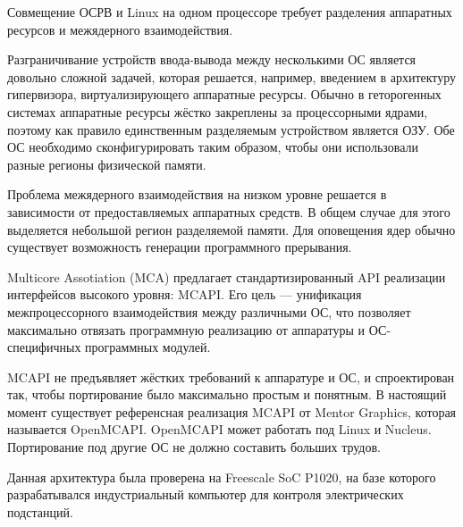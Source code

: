 \documentclass[10pt, a5paper]{article}
\begin{document}
Совмещение ОСРВ и Linux на одном процессоре требует разделения аппаратных ресурсов и межядерного взаимодействия.

Разграничивание устройств ввода-вывода между несколькими ОС является довольно сложной задачей, которая решается, например, введением в архитектуру гипервизора, виртуализирующего аппаратные ресурсы. Обычно в геторогенных системах аппаратные ресурсы жёстко закреплены за процессорными ядрами, поэтому как правило единственным разделяемым устройством является ОЗУ. Обе ОС необходимо сконфигурировать таким образом, чтобы они использовали разные регионы физической памяти.

Проблема межядерного взаимодействия на низком уровне решается в зависимости от предоставляемых аппаратных средств. В общем случае для этого выделяется небольшой регион разделяемой памяти. Для оповещения ядер обычно существует возможность генерации программного прерывания.

Multicore Assotiation (MCA) предлагает стандартизированный API реализации интерфейсов высокого уровня: MCAPI. Его цель --- унификация межпроцессорного взаимодействия между различными ОС, что позволяет максимально отвязать программную реализацию от аппаратуры и ОС-специфичных программных модулей.

MCAPI не предъявляет жёстких требований к аппаратуре и ОС, и спроектирован так, чтобы портирование было максимально простым и понятным. В настоящий момент существует референсная реализация MCAPI от Mentor Graphics, которая называется OpenMCAPI. OpenMCAPI может работать под Linux и Nucleus. Портирование под другие ОС не должно составить больших трудов.

Данная архитектура была проверена на Freescale SoC P1020, на базе которого разрабатывался индустриальный компьютер для контроля электрических подстанций.
\end{document}

